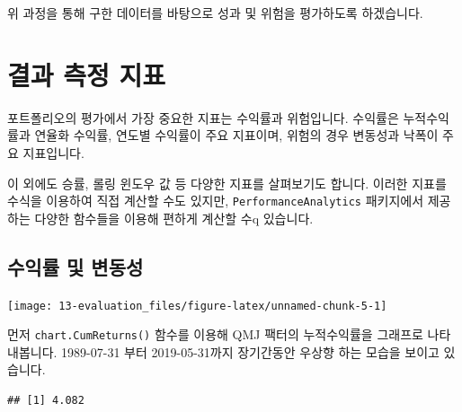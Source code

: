 \documentclass[12pt,]{book}
\newenvironment{Shaded}{\begin{snugshade}}{\end{snugshade}}
\newcommand{\CommentTok}[1]{\textcolor[rgb]{0.56,0.35,0.01}{\textit{#1}}}
\newcommand{\DecValTok}[1]{\textcolor[rgb]{0.00,0.00,0.81}{#1}}
\newcommand{\KeywordTok}[1]{\textcolor[rgb]{0.13,0.29,0.53}{\textbf{#1}}}
\newcommand{\NormalTok}[1]{#1}
\newcommand{\OperatorTok}[1]{\textcolor[rgb]{0.81,0.36,0.00}{\textbf{#1}}}
\newcommand{\StringTok}[1]{\textcolor[rgb]{0.31,0.60,0.02}{#1}}
\begin{document}
위 과정을 통해 구한 데이터를 바탕으로 성과 및 위험을 평가하도록 하겠습니다.

\hypertarget{section-86}{%
\section{결과 측정 지표}\label{section-86}}

포트폴리오의 평가에서 가장 중요한 지표는 수익률과 위험입니다. 수익률은 누적수익률과 연율화 수익률, 연도별 수익률이 주요 지표이며, 위험의 경우 변동성과 낙폭이 주요 지표입니다.

이 외에도 승률, 롤링 윈도우 값 등 다양한 지표를 살펴보기도 합니다. 이러한 지표를 수식을 이용하여 직접 계산할 수도 있지만, \texttt{PerformanceAnalytics} 패키지에서 제공하는 다양한 함수들을 이용해 편하게 계산할 수q 있습니다.

\hypertarget{section-87}{%
\subsection{수익률 및 변동성}\label{section-87}}

\begin{Shaded}
\end{Shaded}

\begin{center}\texttt{[image: 13-evaluation\_files/figure-latex/unnamed-chunk-5-1]} \end{center}

먼저 \texttt{chart.CumReturns()} 함수를 이용해 QMJ 팩터의 누적수익률을 그래프로 나타내봅니다. 1989-07-31 부터 2019-05-31까지 장기간동안 우상향 하는 모습을 보이고 있습니다.

\begin{Shaded}
\end{Shaded}

\begin{verbatim}
## [1] 4.082
\end{verbatim}

\begin{Shaded}
\end{Shaded}
\end{document}
